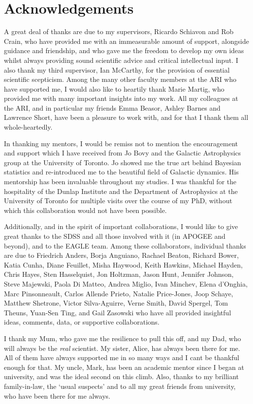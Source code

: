 \chapter*{Acknowledgements}

A great deal of thanks are due to my supervisors, Ricardo Schiavon and Rob Crain, who have provided me with an immeasurable amount of support, alongside guidance and friendship, and who gave me the freedom to develop my own ideas whilst always providing sound scientific advice and critical intellectual input. I also thank my third supervisor, Ian McCarthy, for the provision of essential scientific scepticism. Among the many other faculty members at the ARI who have supported me, I would also like to heartily thank Marie Martig, who provided me with many important insights into my work. All my colleagues at the ARI, and in particular my friends Emma Beasor, Ashley Barnes and Lawrence Short, have been a pleasure to work with, and for that I thank them all whole-heartedly. 

In thanking my mentors, I would be remiss not to mention the encouragement and support which I have received from Jo Bovy and the Galactic Astrophysics group at the University of Toronto. Jo showed me the true art behind Bayesian statistics and re-introduced me to the beautiful field of Galactic dynamics. His mentorship has been invaluable throughout my studies. I was thankful for the hospitality of the Dunlap Institute and the Department of Astrophysics at the University of Toronto for multiple visits over the course of my PhD, without which this collaboration would not have been possible. 

Additionally, and in the spirit of important collaborations, I would like to give great thanks to the SDSS and all those involved with it (in APOGEE and beyond), and to the EAGLE team. Among these collaborators, individual thanks are due to Friedrich Anders, Borja Anguiano, Rachael Beaton, Richard Bower, Katia Cunha, Diane Feuillet, Misha Haywood, Keith Hawkins, Michael Hayden, Chris Hayes, Sten Hasselquist, Jon Holtzman, Jason Hunt, Jennifer Johnson, Steve Majewski, Paola Di Matteo, Andrea Miglio, Ivan Minchev, Elena d'Onghia, Marc Pinsonneault, Carlos Allende Prieto, Natalie Price-Jones, Joop Schaye, Matthew Shetrone, Victor Silva-Aguirre, Verne Smith, David Spergel, Tom Theuns, Yuan-Sen Ting, and Gail Zasowski who have all provided insightful ideas, comments, data, or supportive collaborations.


I thank my Mum, who gave me the resilience to pull this off, and my Dad, who will always be the \emph{real} scientist. My sister, Alice, has always been there for me. All of them have always supported me in so many ways and I cant be thankful enough for that. My uncle, Mark, has been an academic mentor since I began at university, and was the ideal second on this climb. Also, thanks to my brilliant family-in-law, the `usual suspects' and to all my great friends from university, who have been there for me always. 

